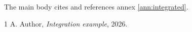 \documentclass[PAC,annexes,glossaries]{P3CTeX}
\begin{document}
The main body cites \cite{integration-book} and references
annex \ref{ann:integrated}.
\ifnum{}\else
  \PackageError{integration}{Deferred annex executed too soon}{}
\fi
\begin{thebibliography}{1}
 A. Author, \textit{Integration example}, 2026.
\end{thebibliography}
\end{document}
